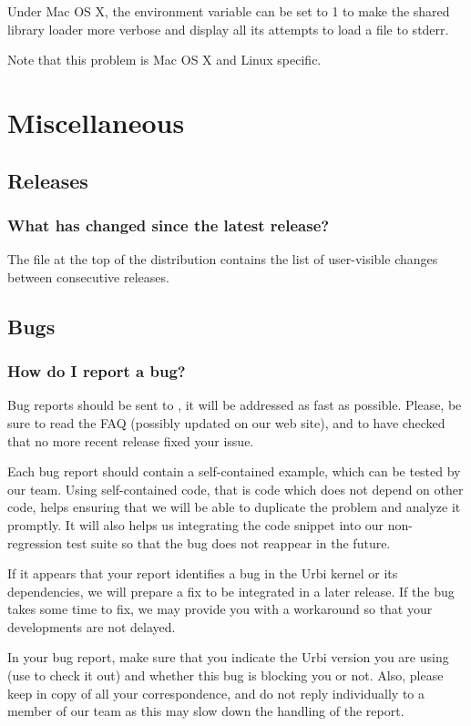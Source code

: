 Under Mac OS X, the  environment variable can
be set to 1 to make the shared library loader more verbose and display
all its attempts to load a file to stderr.

Note that this problem is Mac OS X and Linux specific.

\section{Miscellaneous}
\subsection{Releases}
\subsubsection{What has changed since the latest release?}
The file  at the top of the distribution
contains the list of user-visible changes between consecutive
releases.

\subsection{Bugs}
\subsubsection{How do I report a bug?}

Bug reports should be sent to , it
will be addressed as fast as possible.  Please, be sure to read the
FAQ (possibly updated on our web site), and to have checked that no
more recent release fixed your issue.

Each bug report should contain a self-contained example, which can be
tested by our team. Using self-contained code, that is code which does
not depend on other code, helps ensuring that we will be able to
duplicate the problem and analyze it promptly. It will also helps us
integrating the code snippet into our non-regression test suite so
that the bug does not reappear in the future.

If it appears that your report identifies a bug in the Urbi kernel or
its dependencies, we will prepare a fix to be integrated in a later
release. If the bug takes some time to fix, we may provide you with a
workaround so that your developments are not delayed.

In your bug report, make sure that you indicate the Urbi version you
are using (use  to check it out) and whether this
bug is blocking you or not. Also, please keep
 in copy of all your
correspondence, and do not reply individually to a member of our team
as this may slow down the handling of the report.


\ifx\ifHtml\undefined\else
  \let\subsubsection\subsubsectionSave
\fi


